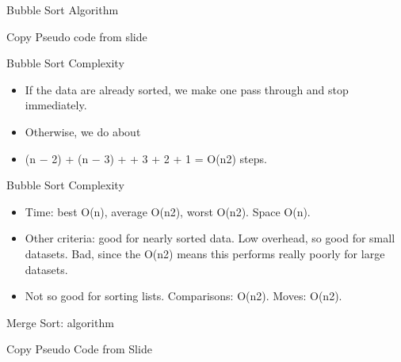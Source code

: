 \documentclass{beamer}
\begin{document}
\begin{frame}
\end{frame} \begin{frame}

Bubble Sort Algorithm

Copy Pseudo code from slide
\end{frame} \begin{frame}

Bubble Sort Complexity

\begin{itemize}
\item If the data are already sorted, we make one pass through and stop immediately.
\item Otherwise, we do about
\item (n $-$ 2) + (n $-$ 3) + {\textperiodcentered} {\textperiodcentered} {\textperiodcentered} + 3 + 2 + 1 = O(n2)
steps.
\end{itemize}

\end{frame} \begin{frame}

Bubble Sort Complexity

\begin{itemize}
\item Time: best O(n), average O(n2), worst O(n2). Space O(n).
\item Other criteria: good for nearly sorted data. Low overhead, so good for small datasets. Bad, since the O(n2) means
this performs really poorly for large datasets.
\item Not so good for sorting lists. Comparisons: O(n2). Moves: O(n2).
\end{itemize}

\end{frame} \begin{frame}

Merge Sort: algorithm

Copy Pseudo Code from Slide

\end{frame} 
\end{document}
